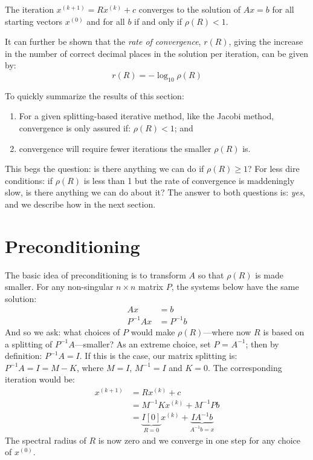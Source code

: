\begin{theorem}
The iteration $x^{(k+1)} = Rx^{(k)} + c$ converges to the solution of $Ax=b$ for all starting vectors $x^{(0)}$ and for all $b$ if and only if $\rho(R)<1$.
\end{theorem}
It can further be shown that the \emph{rate of convergence}, $r(R)$, giving the increase in the number of correct decimal places in the solution per iteration, can be given by:
\begin{equation}
r(R) = -\log_{10}\rho(R)
\end{equation}

To quickly summarize the results of this section:
\begin{enumerate}
\item For a given splitting-based iterative method, like the Jacobi method, convergence is only assured if: $\rho(R)< 1$; and
\item convergence will require fewer iterations the smaller $\rho(R)$ is.
\end{enumerate}

This begs the question: is there anything we can do if $\rho(R)\ge 1$?  For less dire conditions: if $\rho(R)$ is less than 1 but the rate of convergence is maddeningly slow, is there anything we can do about it?  The answer to both questions is: \emph{yes}, and we describe how in the next section.

\section{Preconditioning}
The basic idea of preconditioning is to transform $A$ so that $\rho(R)$ is made smaller.  For any non-singular $n \times n$ matrix $P$, the systems below have the same solution:
\begin{align*}
Ax &= b \\
P^{-1}Ax &= P^{-1}b
\end{align*}
And so we ask: what choices of $P$ would make $\rho(R)$---where now $R$ is based on a splitting of $P^{-1}A$---smaller?  As an extreme choice, set $P$ = $A^{-1}$; then by definition: $P^{-1}A = I$.  If this is the case, our matrix splitting is: $P^{-1}A = I = M - K$, where $M=I$, $M^{-1}=I$ and $K=0$.  The corresponding iteration would be:
\begin{align*}
x^{(k+1)} &= Rx^{(k)} + c \\
&= M^{-1}Kx^{(k)} + M^{-1}Pb \\
&= \underbrace{I[0]}_{R = 0}x^{(k)} + \underbrace{IA^{-1}b}_{A^{-1}b = x}
\end{align*}
The spectral radius of $R$ is now zero and we converge in one step for any choice of $x^{(0)}$.

